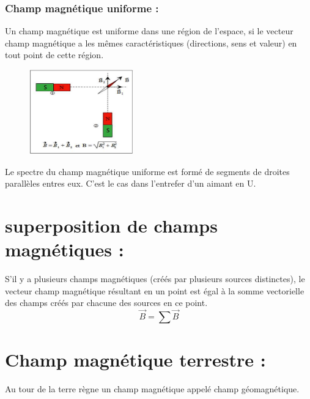 \documentclass[12pt]{article}
\begin{document}
\subsubsection{Champ magnétique uniforme :}
Un champ magnétique est uniforme dans une région de l’espace, si le vecteur champ
magnétique a les mêmes caractéristiques (directions, sens et valeur) en tout point de
cette région.
  
  \begin{figure}
    \includegraphics[width=0.4\textwidth]{./img/superpositio_mag_B.png}
\end{figure}

Le spectre du champ magnétique uniforme est formé de segments de droites
parallèles entres eux. C’est le cas dans l’entrefer d’un aimant en U.
\section{superposition de champs magnétiques :}
S’il y a plusieurs champs magnétiques (créés par plusieurs sources distinctes), le
vecteur champ magnétique résultant en un point est égal à la somme vectorielle des
champs créés par chacune des sources en ce point.
$$\vec{B} = \sum \vec{B}$$
  \section{Champ magnétique terrestre :}
Au tour de la terre règne un champ magnétique appelé champ géomagnétique.
\end{document}
